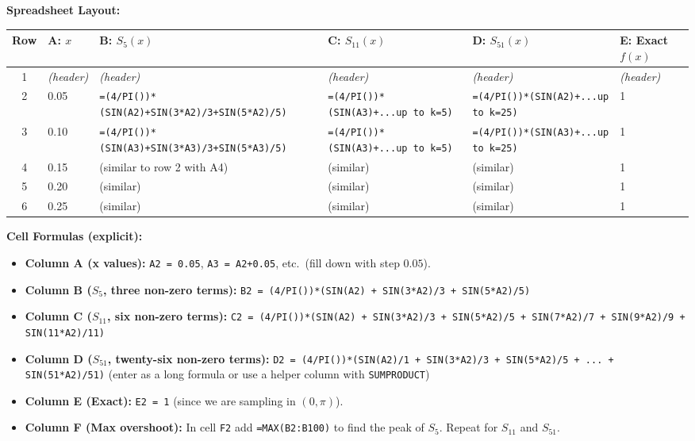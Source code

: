 \documentclass[12pt,a4paper]{article}
\begin{document}
\medskip
\textbf{Spreadsheet Layout:}

\begin{center}
\begin{tabular}{@{}clllll@{}}
\toprule
\textbf{Row} & \textbf{A: $x$} & \textbf{B: $S_5(x)$} & \textbf{C: $S_{11}(x)$} & \textbf{D: $S_{51}(x)$} & \textbf{E: Exact $f(x)$} \\
\midrule
1 & \textit{(header)} & \textit{(header)} & \textit{(header)} & \textit{(header)} & \textit{(header)} \\
2 & 0.05 & \texttt{=(4/PI())*(SIN(A2)+SIN(3*A2)/3+SIN(5*A2)/5)} & \texttt{=(4/PI())*(SIN(A3)+...up to k=5)} & \texttt{=(4/PI())*(SIN(A2)+...up to k=25)} & 1 \\
3 & 0.10 & \texttt{=(4/PI())*(SIN(A3)+SIN(3*A3)/3+SIN(5*A3)/5)} & \texttt{=(4/PI())*(SIN(A3)+...up to k=5)} & \texttt{=(4/PI())*(SIN(A3)+...up to k=25)} & 1 \\
4 & 0.15 & (similar to row 2 with A4) & (similar) & (similar) & 1 \\
5 & 0.20 & (similar) & (similar) & (similar) & 1 \\
6 & 0.25 & (similar) & (similar) & (similar) & 1 \\
\bottomrule
\end{tabular}
\end{center}

\medskip
\textbf{Cell Formulas (explicit):}

\begin{itemize}[noitemsep]
   \item \textbf{Column A (x values):} \texttt{A2 = 0.05}, \texttt{A3 = A2+0.05}, etc.\ (fill down with step $0.05$).
   \item \textbf{Column B ($S_5$, three non-zero terms):}
         \texttt{B2 = (4/PI())*(SIN(A2) + SIN(3*A2)/3 + SIN(5*A2)/5)}
   \item \textbf{Column C ($S_{11}$, six non-zero terms):}
         \texttt{C2 = (4/PI())*(SIN(A2) + SIN(3*A2)/3 + SIN(5*A2)/5 + SIN(7*A2)/7 + SIN(9*A2)/9 + SIN(11*A2)/11)}
   \item \textbf{Column D ($S_{51}$, twenty-six non-zero terms):}
         \texttt{D2 = (4/PI())*(SIN(A2)/1 + SIN(3*A2)/3 + SIN(5*A2)/5 + ... + SIN(51*A2)/51)}
         (enter as a long formula or use a helper column with \texttt{SUMPRODUCT})
   \item \textbf{Column E (Exact):} \texttt{E2 = 1} (since we are sampling in $(0,\pi)$).
   \item \textbf{Column F (Max overshoot):} In cell \texttt{F2} add \texttt{=MAX(B2:B100)} to find the peak of $S_5$. Repeat for $S_{11}$ and $S_{51}$.
\end{itemize}
\end{document}
